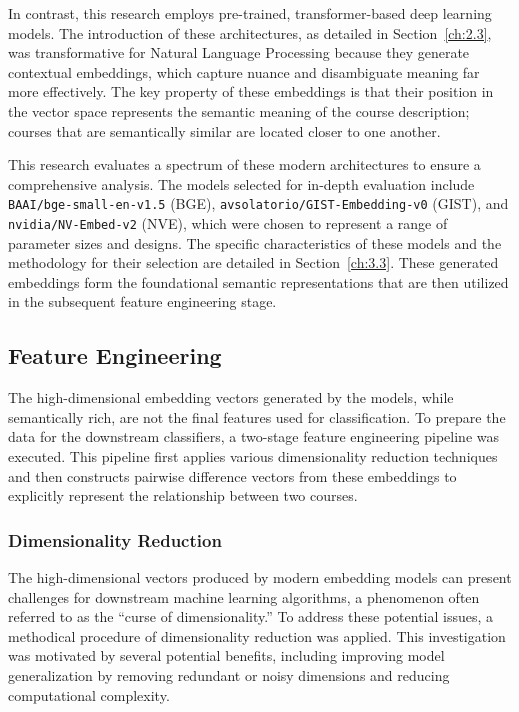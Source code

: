 In contrast, this research employs pre-trained, transformer-based deep learning models. The introduction of these architectures, as detailed in Section~\ref{ch:2.3}, was transformative for Natural Language Processing because they generate contextual embeddings, which capture nuance and disambiguate meaning far more effectively. The key property of these embeddings is that their position in the vector space represents the semantic meaning of the course description; courses that are semantically similar are located closer to one another. 

This research evaluates a spectrum of these modern architectures to ensure a comprehensive analysis. The models selected for in-depth evaluation include \verb|BAAI/bge-small-en-v1.5| (BGE), \verb|avsolatorio/GIST-Embedding-v0| (GIST), and \verb|nvidia/NV-Embed-v2| (NVE), which were chosen to represent a range of parameter sizes and designs. The specific characteristics of these models and the methodology for their selection are detailed in Section~\ref{ch:3.3}. These generated embeddings form the foundational semantic representations that are then utilized in the subsequent feature engineering stage.{\setlength{\emergencystretch}{5em}\par}

\subsection{Feature Engineering}\label{ch:3.2.3}
The high-dimensional embedding vectors generated by the models, while semantically rich, are not the final features used for classification. To prepare the data for the downstream classifiers, a two-stage feature engineering pipeline was executed. This pipeline first applies various dimensionality reduction techniques and then constructs pairwise difference vectors from these embeddings to explicitly represent the relationship between two courses.

\subsubsection{Dimensionality Reduction}\label{ch:3.2.3.1}
The high-dimensional vectors produced by modern embedding models can present challenges for downstream machine learning algorithms, a phenomenon often referred to as the ``curse of dimensionality.'' To address these potential issues, a methodical procedure of dimensionality reduction was applied. This investigation was motivated by several potential benefits, including improving model generalization by removing redundant or noisy dimensions and reducing computational complexity.

